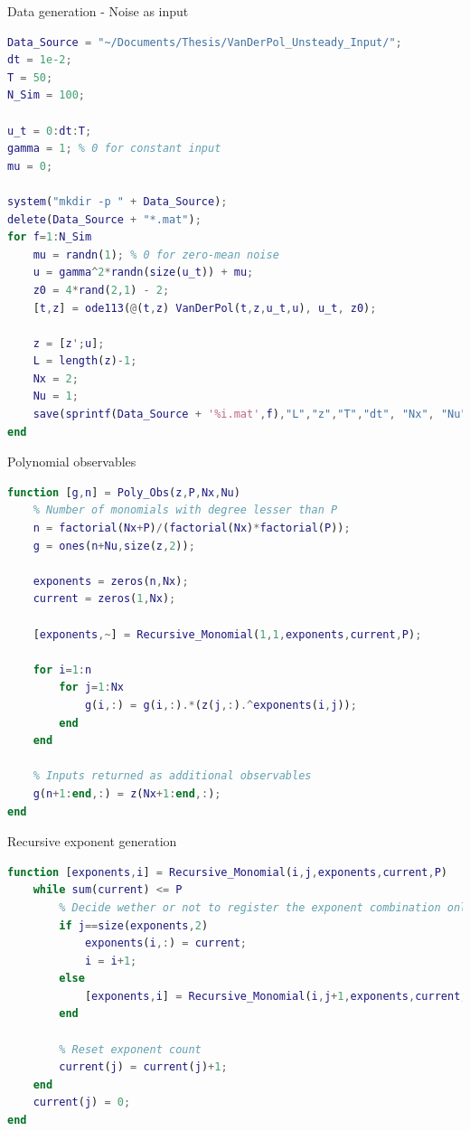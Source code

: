 \documentclass{beamer}
\begin{document}
\begin{frame}[fragile]{Data generation - Noise as input}
    \begin{lstlisting}[language=Matlab,basicstyle=\tiny]
Data_Source = "~/Documents/Thesis/VanDerPol_Unsteady_Input/";
dt = 1e-2;
T = 50;
N_Sim = 100;

u_t = 0:dt:T;
gamma = 1; % 0 for constant input
mu = 0;

system("mkdir -p " + Data_Source);
delete(Data_Source + "*.mat");
for f=1:N_Sim
    mu = randn(1); % 0 for zero-mean noise
    u = gamma^2*randn(size(u_t)) + mu;
    z0 = 4*rand(2,1) - 2;
    [t,z] = ode113(@(t,z) VanDerPol(t,z,u_t,u), u_t, z0);

    z = [z';u];
    L = length(z)-1;
    Nx = 2;
    Nu = 1;
    save(sprintf(Data_Source + '%i.mat',f),"L","z","T","dt", "Nx", "Nu");
end
    \end{lstlisting}
\end{frame}

\begin{frame}[fragile]{Polynomial observables}
    \begin{lstlisting}[language=Matlab,basicstyle=\tiny]
function [g,n] = Poly_Obs(z,P,Nx,Nu)
    % Number of monomials with degree lesser than P
    n = factorial(Nx+P)/(factorial(Nx)*factorial(P));
    g = ones(n+Nu,size(z,2));

    exponents = zeros(n,Nx);
    current = zeros(1,Nx);

    [exponents,~] = Recursive_Monomial(1,1,exponents,current,P);

    for i=1:n
        for j=1:Nx
            g(i,:) = g(i,:).*(z(j,:).^exponents(i,j));
        end
    end
    
    % Inputs returned as additional observables
    g(n+1:end,:) = z(Nx+1:end,:);
end
    \end{lstlisting}
\end{frame}

\begin{frame}[fragile]{Recursive exponent generation}
    \begin{lstlisting}[language=Matlab,basicstyle=\tiny]
function [exponents,i] = Recursive_Monomial(i,j,exponents,current,P)
    while sum(current) <= P
        % Decide wether or not to register the exponent combination only on the deepest level of recursion
        if j==size(exponents,2)
            exponents(i,:) = current;
            i = i+1;
        else
            [exponents,i] = Recursive_Monomial(i,j+1,exponents,current,P);
        end

        % Reset exponent count
        current(j) = current(j)+1;
    end
    current(j) = 0;
end
    \end{lstlisting}
\end{frame}
\end{document}
